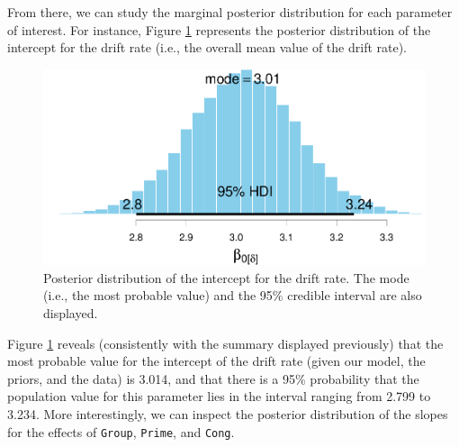 \documentclass[
  11pt,
  english,
  ,doc,floatsintext]{apa6}
\newenvironment{Shaded}{}{}
\newcommand{\CommentTok}[1]{\textcolor[rgb]{0.38,0.63,0.69}{\textit{#1}}}
\newcommand{\DataTypeTok}[1]{\textcolor[rgb]{0.56,0.13,0.00}{#1}}
\newcommand{\DecValTok}[1]{\textcolor[rgb]{0.25,0.63,0.44}{#1}}
\newcommand{\KeywordTok}[1]{\textcolor[rgb]{0.00,0.44,0.13}{\textbf{#1}}}
\newcommand{\NormalTok}[1]{#1}
\newcommand{\OperatorTok}[1]{\textcolor[rgb]{0.40,0.40,0.40}{#1}}
\newcommand{\OtherTok}[1]{\textcolor[rgb]{0.00,0.44,0.13}{#1}}
\newcommand{\StringTok}[1]{\textcolor[rgb]{0.25,0.44,0.63}{#1}}
\begin{document}
From there, we can study the marginal posterior distribution for each parameter of interest. For instance, Figure \ref{fig:posterior-intercept-drift} represents the posterior distribution of the intercept for the drift rate (i.e., the overall mean value of the drift rate).

\begin{Shaded}
\end{Shaded}

\begin{figure}[!htb]

{\centering \includegraphics[width=0.75\linewidth]{supplementary_materials_files/figure-latex/posterior-intercept-drift-1} 

}

\caption{Posterior distribution of the intercept for the drift rate. The mode (i.e., the most probable value) and the 95\% credible interval are also displayed.}\label{fig:posterior-intercept-drift}
\end{figure}

Figure \ref{fig:posterior-intercept-drift} reveals (consistently with the summary displayed previously) that the most probable value for the intercept of the drift rate (given our model, the priors, and the data) is 3.014, and that there is a 95\% probability that the population value for this parameter lies in the interval ranging from 2.799 to 3.234. More interestingly, we can inspect the posterior distribution of the slopes for the effects of \texttt{Group}, \texttt{Prime}, and \texttt{Cong}.
\end{document}
